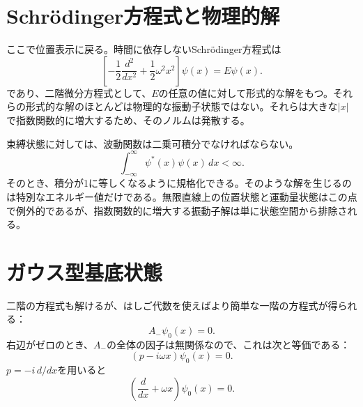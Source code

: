 \begin{classroomqa}
\end{classroomqa}

\section{Schr\"odinger方程式と物理的解}

ここで位置表示に戻る。時間に依存しないSchr\"odinger方程式は
\begin{equation}
\left[
-\frac12\frac{d^{2}}{dx^{2}}
+\frac12\omega^{2}x^{2}
\right]\psi(x)=E\psi(x).
\end{equation}
であり、二階微分方程式として、\(E\)の任意の値に対して形式的な解をもつ。それらの形式的な解のほとんどは物理的な振動子状態ではない。それらは大きな\(\lvert x\rvert\)で指数関数的に増大するため、そのノルムは発散する。

束縛状態に対しては、波動関数は二乗可積分でなければならない。
\begin{equation}
\int_{-\infty}^{\infty}\psi^{*}(x)\psi(x)\,dx<\infty.
\end{equation}
そのとき、積分が1に等しくなるように規格化できる。そのような解を生じるのは特別なエネルギー値だけである。無限直線上の位置状態と運動量状態はこの点で例外的であるが、指数関数的に増大する振動子解は単に状態空間から排除される。

\section{ガウス型基底状態}

二階の方程式も解けるが、はしご代数を使えばより簡単な一階の方程式が得られる：
\begin{equation}
A_{-}\psi_{0}(x)=0.
\end{equation}
右辺がゼロのとき、\(A_{-}\)の全体の因子は無関係なので、これは次と等価である：
\begin{equation}
(p-i\omega x)\psi_{0}(x)=0.
\end{equation}
\(p=-i\,d/dx\)を用いると
\begin{equation}
\left(\frac{d}{dx}+\omega x\right)\psi_{0}(x)=0.
\end{equation}

